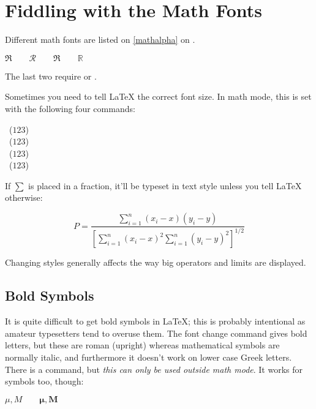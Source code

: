 \section{Fiddling with the Math Fonts}\label{sec:fontsz}
Different math fonts are listed on \autoref{mathalpha} on .
\begin{example}
 $\Re \qquad
  \mathcal{R} \qquad
  \mathfrak{R} \qquad
  \mathbb{R} \qquad $  
\end{example}
The last two require  or .

Sometimes you need to tell \LaTeX{} the correct font
size. In math mode, this is set with the following four commands:
\begin{lscommand}
  ~($\displaystyle 123$)\\
  ~($\textstyle 123$)\\
  ~($\scriptstyle 123$)\\
  ~($\scriptscriptstyle 123$)
\end{lscommand}

If $\sum$ is placed in a fraction, it'll be typeset in text style unless you tell
\LaTeX{} otherwise:
\begin{example}
\begin{equation*}
 P = \frac{\displaystyle{ 
   \sum_{i=1}^n (x_i- x)
   (y_i- y)}} 
   {\displaystyle{\left[
   \sum_{i=1}^n(x_i-x)^2
   \sum_{i=1}^n(y_i- y)^2
   \right]^{1/2}}}
\end{equation*}    
\end{example}
Changing styles generally affects the way big operators and limits are displayed.


\subsection{Bold Symbols}%

It is quite difficult to get bold symbols in \LaTeX{}; this is
probably intentional as amateur typesetters tend to overuse them.  The
font change command  gives bold letters, but these are
roman (upright) whereas mathematical symbols are normally italic, and
furthermore it doesn't work on lower case Greek letters.
There is a  command, but \emph{this can only be used
  outside math mode}. It works for symbols too, though:
\begin{example}
$\mu, M \qquad 
\mathbf{\mu}, \mathbf{M}$
\qquad {}
\end{example}

